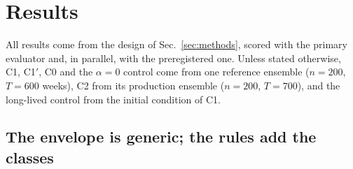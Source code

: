 \section{Results}
\label{sec:results}

All results come from the design of Sec.~\ref{sec:methods}, scored with the primary evaluator and, in parallel,
with the preregistered one. Unless stated otherwise, \textsf{C1}, \textsf{C1}$'$, \textsf{C0} and the $\alpha=0$
control come from one reference ensemble ($n=200$, $T=600$ weeks), \textsf{C2} from its production ensemble
($n=200$, $T=700$), and the long-lived control from the initial condition of \textsf{C1}.

\subsection{The envelope is generic; the rules add the classes}
\label{sec:res-null}

